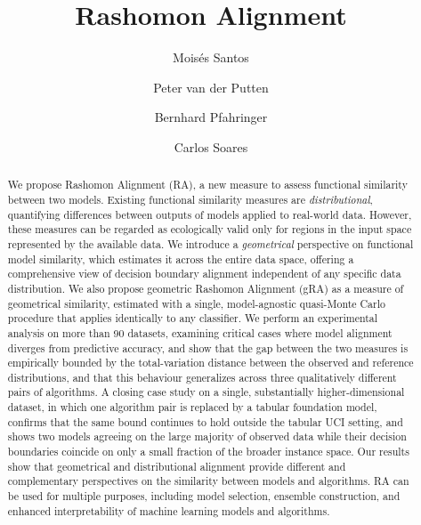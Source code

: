 \documentclass[runningheads]{llncs}
\begin{document}
\title{Rashomon Alignment}


\author{Moisés Santos \and Peter van der Putten \and Bernhard Pfahringer \and Carlos Soares}



\maketitle

\begin{abstract}
We propose Rashomon Alignment (RA), a new measure to assess functional similarity between two models. Existing functional similarity measures are \emph{distributional}, quantifying differences between outputs of models applied to real-world data.
However, these measures can be regarded as ecologically valid only for regions in the input space represented by the available data.
We introduce a \emph{geometrical} perspective on functional model similarity, which estimates it across the entire data space, offering a comprehensive view of decision boundary alignment independent of any specific data distribution. We also propose geometric Rashomon Alignment (gRA) as a measure of geometrical similarity, estimated with a single, model-agnostic quasi-Monte Carlo procedure that applies identically to any classifier. We perform an experimental analysis on more than 90 datasets, examining critical cases where model alignment diverges from predictive accuracy, and show that the gap between the two measures is empirically bounded by the total-variation distance between the observed and reference distributions, and that this behaviour generalizes across three qualitatively different pairs of algorithms. A closing case study on a single, substantially higher-dimensional dataset, in which one algorithm pair is replaced by a tabular foundation model, confirms that the same bound continues to hold outside the tabular UCI setting, and shows two models agreeing on the large majority of observed data while their decision boundaries coincide on only a small fraction of the broader instance space.
Our results show that geometrical and distributional alignment provide different and complementary perspectives on the similarity between models and algorithms. RA can be used for multiple purposes, including model selection, ensemble construction, and enhanced interpretability of machine learning models and algorithms.
\end{abstract}
\end{document}

